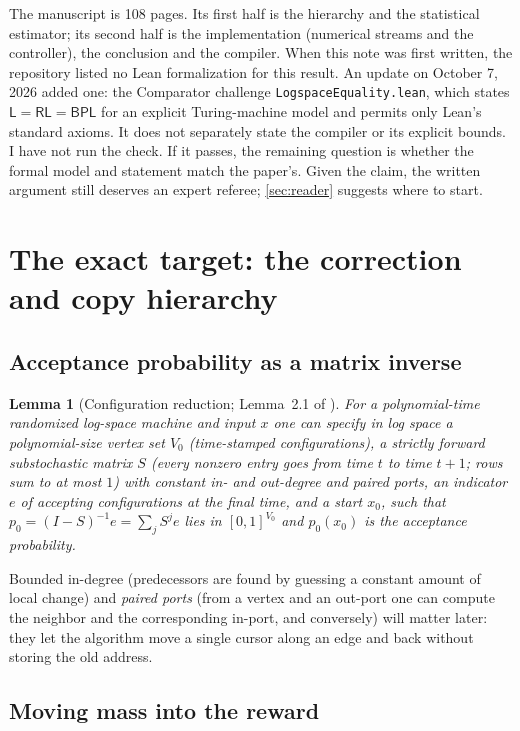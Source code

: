 \documentclass[11pt]{article}
\newtheorem{lemma}[theorem]{Lemma}
\theoremstyle{definition}
\theoremstyle{remark}
\newcommand{\Lc}{\mathsf L}
\newcommand{\RL}{\mathsf{RL}}
\newcommand{\BPL}{\mathsf{BPL}}
\begin{document}
The manuscript is 108 pages. Its first half is the hierarchy and the statistical
estimator; its second half is the implementation (numerical streams and the
controller), the conclusion and the compiler. When this note was first written,
the repository listed no Lean formalization for this result. An update on
October 7, 2026 added one: the Comparator challenge
\texttt{LogspaceEquality.lean}, which states $\Lc=\RL=\BPL$ for an explicit
Turing-machine model and permits only Lean's standard axioms. It does not
separately state the compiler or its explicit bounds. I have not run the
check. If it passes, the remaining question is whether the formal model and
statement match the paper's. Given the claim, the written argument still
deserves an expert referee; \cref{sec:reader} suggests where to start.

\section{The exact target: the correction and copy hierarchy}\label{sec:hierarchy}

\subsection{Acceptance probability as a matrix inverse}\label{sec:config}

\begin{lemma}[Configuration reduction; Lemma~2.1 of \cite{OpenAI-BPL}]\label{lem:config}
For a polynomial-time randomized log-space machine and input $x$ one can
specify in log space a polynomial-size vertex set $V_0$ (time-stamped
configurations), a strictly forward substochastic matrix $S$ (every nonzero entry
goes from time $t$ to time $t+1$; rows sum to at most $1$) with constant in- and
out-degree and paired ports, an indicator $e$ of accepting configurations at the
final time, and a start $x_0$, such that $p_0=(I-S)^{-1}e=\sum_jS^je$ lies in
$[0,1]^{V_0}$ and $p_0(x_0)$ is the acceptance probability.
\end{lemma}

Bounded in-degree (predecessors are found by guessing a constant amount of local
change) and \emph{paired ports} (from a vertex and an out-port one can compute the
neighbor and the corresponding in-port, and conversely) will matter later: they
let the algorithm move a single cursor along an edge and back without storing the
old address.

\subsection{Moving mass into the reward}\label{sec:correction}
\end{document}
